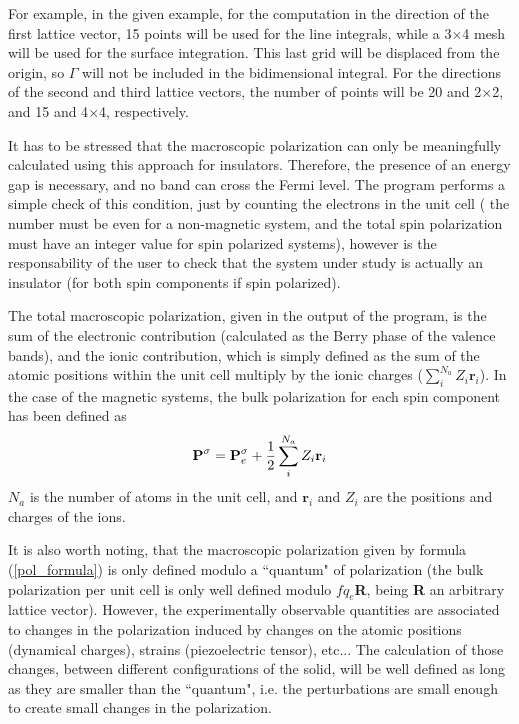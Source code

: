 \begin{description}
For example, in the given example, for the computation in the
direction of the first lattice vector, 15 points will be used for the
line integrals, while a 3$\times$4 mesh will be used for the surface
integration. This last grid will be displaced from the origin, so
$\Gamma$ will not be included in the bidimensional integral. For the
directions of the second and third lattice vectors, the number of
points will be 20 and 2$\times$2, and 15 and 4$\times$4, respectively.

It has to be stressed that the macroscopic polarization can only be
meaningfully calculated using this approach for insulators.
Therefore, the presence of an energy gap is necessary, and no band can
cross the Fermi level. The program performs a simple check of this
condition, just by counting the electrons in the unit cell ( the
number must be even for a non-magnetic system, and the total spin
polarization must have an integer value for spin polarized systems),
however is the responsability of the user to check that the system
under study is actually an insulator (for both spin components if spin
polarized).

The total macroscopic polarization, given in the output of the
program, is the sum of the electronic contribution (calculated as the
Berry phase of the valence bands), and the ionic contribution, which
is simply defined as the sum of the atomic positions within the unit
cell multiply by the ionic charges ($\sum_i^{N_a} Z_i \textbf{r}_i$).  In
the case of the magnetic systems, the bulk polarization for each spin
component has been defined as
\begin{equation}
       \textbf{P}^\sigma = \textbf{P}_e^\sigma +
   {1 \over 2} \sum_i^{N_a}  Z_i \textbf{r}_i
\end{equation}
$N_a$ is the number of atoms in the unit cell, and $\textbf{r}_i$ and
$Z_i$
are the positions and charges of the ions.

It is also worth noting, that the macroscopic polarization given by
formula (\ref{pol_formula}) is only defined modulo a ``quantum" of
polarization (the bulk polarization per unit cell is only well defined
modulo $fq_e$\textbf{R}, being \textbf{R} an arbitrary lattice
vector). However, the experimentally observable quantities are
associated to changes in the polarization induced by changes on the
atomic positions (dynamical charges), strains (piezoelectric tensor),
etc... The calculation of those changes, between different
configurations of the solid, will be well defined as long as they are
smaller than the ``quantum", i.e. the perturbations are small enough
to create small changes in the polarization.


\end{description}
